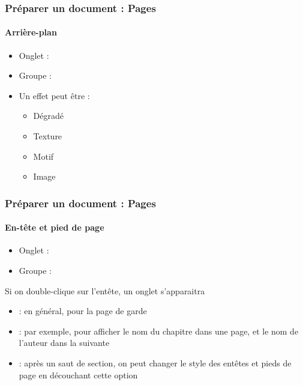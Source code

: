 \documentclass[xcolor=table]{beamer}
\begin{document}
\begin{frame}[t]
\frametitle{Préparer un document : Pages}
\framesubtitle{Arrière-plan}

\begin{minipage}{0.49\textwidth}
	\begin{itemize}
		\item Onglet : 
		\item Groupe : 
		\item Un effet peut être : 
		\begin{itemize}
			\item Dégradé
			\item Texture
			\item Motif
			\item Image
		\end{itemize}
	\end{itemize}
\end{minipage}
\begin{minipage}{0.50\textwidth}
\end{minipage}

\end{frame}



\begin{frame}
\frametitle{Préparer un document : Pages}
\framesubtitle{En-tête et pied de page}

\begin{minipage}{0.78\textwidth}
	\begin{itemize}
		\item Onglet :  
		\item Groupe : 
	\end{itemize}
\end{minipage}
\begin{minipage}{0.2\textwidth}
\end{minipage}

\vspace{6pt}
Si on double-clique sur l'entête, un onglet s'apparaitra
\begin{itemize}
	\item {} : en général, pour la page de garde 
	\item {} : par exemple, pour afficher le nom du chapitre dans une page, et le nom de l'auteur dans la suivante
	\item {} : après un saut de section, on peut changer le style des entêtes et pieds de page en découchant cette option
\end{itemize}


\end{frame}
\end{document}
